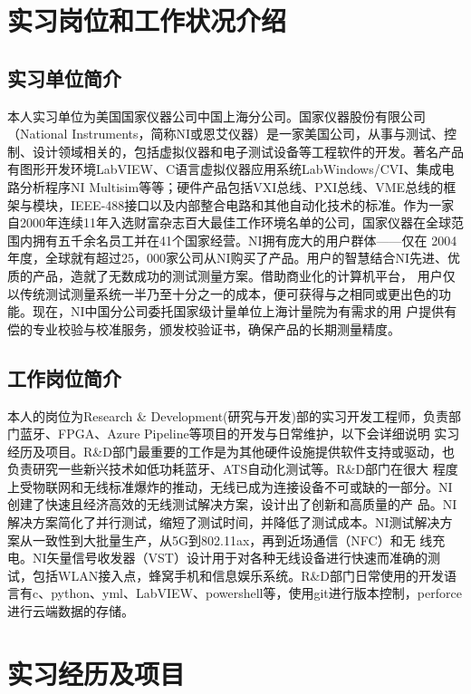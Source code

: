 \documentclass[UTF8]{ctexart}
\begin{document}
\section{实习岗位和工作状况介绍}
\subsection{实习单位简介}
本人实习单位为美国国家仪器公司中国上海分公司。国家仪器股份有限公司（National Instruments，简称NI或恩艾仪器）是一家美国公司，从事与测试、控
制、设计领域相关的，包括虚拟仪器和电子测试设备等工程软件的开发。著名产品有图形开发环境LabVIEW、C语言虚拟仪器应用系统LabWindows/CVI、集成电
路分析程序NI Multisim等等；硬件产品包括VXI总线、PXI总线、VME总线的框架与模块，IEEE-488接口以及内部整合电路和其他自动化技术的标准。作为一家
自2000年连续11年入选财富杂志百大最佳工作环境名单的公司，国家仪器在全球范围内拥有五千余名员工并在41个国家经营。NI拥有庞大的用户群体——仅在
2004年度，全球就有超过25，000家公司从NI购买了产品。用户的智慧结合NI先进、优质的产品，造就了无数成功的测试测量方案。借助商业化的计算机平台，
用户仅以传统测试测量系统一半乃至十分之一的成本，便可获得与之相同或更出色的功能。现在，NI中国分公司委托国家级计量单位上海计量院为有需求的用
户提供有偿的专业校验与校准服务，颁发校验证书，确保产品的长期测量精度。
\subsection{工作岗位简介}
本人的岗位为Research \& Development(研究与开发)部的实习开发工程师，负责部门蓝牙、FPGA、Azure Pipeline等项目的开发与日常维护，以下会详细说明
实习经历及项目。R\&D部门最重要的工作是为其他硬件设施提供软件支持或驱动，也负责研究一些新兴技术如低功耗蓝牙、ATS自动化测试等。R\&D部门在很大
程度上受物联网和无线标准爆炸的推动，无线已成为连接设备不可或缺的一部分。NI创建了快速且经济高效的无线测试解决方案，设计出了创新和高质量的产
品。NI解决方案简化了并行测试，缩短了测试时间，并降低了测试成本。NI测试解决方案从一致性到大批量生产，从5G到802.11ax，再到近场通信（NFC）和无
线充电。NI矢量信号收发器（VST）设计用于对各种无线设备进行快速而准确的测试，包括WLAN接入点，蜂窝手机和信息娱乐系统。R\&D部门日常使用的开发语
言有c、python、yml、LabVIEW、powershell等，使用git进行版本控制，perforce进行云端数据的存储。

\section{实习经历及项目}
\end{document}
